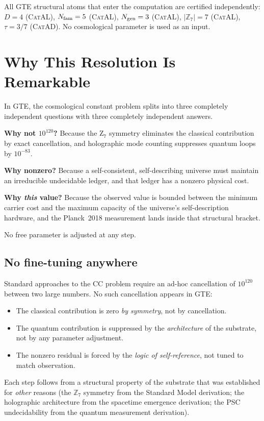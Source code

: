\documentclass[11pt,a4paper]{article}
\newcommand{\ZS}{\mathbb{Z}_7}
\newcommand{\CatAL}{\textsc{CatAL}}
\newcommand{\CatAD}{\textsc{CatAD}}
\begin{document}
All GTE structural atoms that enter the computation are certified independently:
$D = 4$ (\CatAL), $N_{\rm fam} = 5$ (\CatAL), $N_{\rm gen} = 3$ (\CatAL),
$|\ZS| = 7$ (\CatAL), $\tau = 3/7$ (\CatAD).
No cosmological parameter is used as an input.

\section{Why This Resolution Is Remarkable}
\label{sec:remarkable}

\begin{tcolorbox}[colback=boxblue,colframe=blue!40!black,
  title={The three-level resolution in one paragraph}]
In GTE, the cosmological constant problem splits into three completely
independent questions with three completely independent answers.

\textbf{Why not $10^{120}$?}  Because the Z$_7$ symmetry eliminates the
classical contribution by exact cancellation, and holographic mode counting
suppresses quantum loops by $10^{-83}$.

\textbf{Why nonzero?}  Because a self-consistent, self-describing universe
must maintain an irreducible undecidable ledger, and that ledger has a
nonzero physical cost.

\textbf{Why \emph{this} value?}  Because the observed value is bounded between
the minimum carrier cost and the maximum capacity of the universe's
self-description hardware, and the Planck~2018 measurement lands inside that
structural bracket.

No free parameter is adjusted at any step.
\end{tcolorbox}

\subsection{No fine-tuning anywhere}

Standard approaches to the CC problem require an ad-hoc cancellation of
$10^{120}$ between two large numbers.  No such cancellation appears in GTE:
\begin{itemize}[itemsep=3pt]
  \item The classical contribution is zero \emph{by symmetry}, not by
    cancellation.
  \item The quantum contribution is suppressed by the \emph{architecture}
    of the substrate, not by any parameter adjustment.
  \item The nonzero residual is forced by the \emph{logic of self-reference},
    not tuned to match observation.
\end{itemize}
Each step follows from a structural property of the substrate that was
established for \emph{other} reasons (the $\ZS$ symmetry from the Standard
Model derivation; the holographic architecture from the spacetime emergence
derivation; the PSC undecidability from the quantum measurement derivation).
\end{document}
